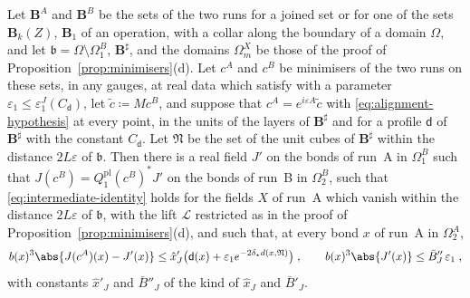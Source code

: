 
\begin{lemma}\label{lem:two-currents-collar}
Let $\mathbf B^A$ and $\mathbf B^B$ be the sets of the two runs for a joined set or for one of the sets $\mathbf B_k(Z)$, $\mathbf B_1$ of an operation, with a collar along the boundary of a domain $\Omega$, and let $\mathfrak b = \Omega \setminus \Omega^B_1$, $\mathbf B^\sharp$, and the domains $\Omega^X_m$ be those of the proof of Proposition~\ref{prop:minimisers}(d). Let $c^A$ and $c^B$ be minimisers of the two runs on these sets, in any gauges, at real data which satisfy \cite[(7)]{BalabanVAR} with a parameter $\varepsilon_1 \leq \varepsilon^J_1(C_{\mathsf d})$, let $\tilde c \coloneqq Mc^B$, and suppose that $c^A = e^{i\varepsilon A}\tilde c$ with \eqref{eq:alignment-hypothesis} at every point, in the units of the layers of $\mathbf B^\sharp$ and for a profile $\mathsf d$ of $\mathbf B^\sharp$ with the constant $C_{\mathsf d}$. Let $\mathfrak N$ be the set of the unit cubes of $\mathbf B^\sharp$ within the distance $2L\varepsilon$ of $\mathfrak b$. Then there is a real field $J'$ on the bonds of run~A in $\Omega^B_1$ such that $J(c^B) = Q^{\mathrm{pl}}_1(c^B)^*J'$ on the bonds of run~B in $\Omega^B_2$, such that \eqref{eq:intermediate-identity} holds for the fields $X$ of run~A which vanish within the distance $2L\varepsilon$ of $\mathfrak b$, with the lift $\mathcal L$ restricted as in the proof of Proposition~\ref{prop:minimisers}(d), and such that, at every bond $x$ of run~A in $\Omega^A_2$,
\[
    b(x)^3\abs{J(c^A)(x) - J'(x)} \leq \hat x'_J\bigl(\mathsf d(x) + \varepsilon_1e^{-2\delta_\star d(x,\mathfrak N)}\bigr)\;,
    \qquad
    b(x)^3\abs{J'(x)} \leq \bar B''_J\,\varepsilon_1\;,
\]
with constants $\hat x'_J$ and $\bar B''_J$ of the kind of $\hat x_J$ and $\bar B'_J$.
\end{lemma}

